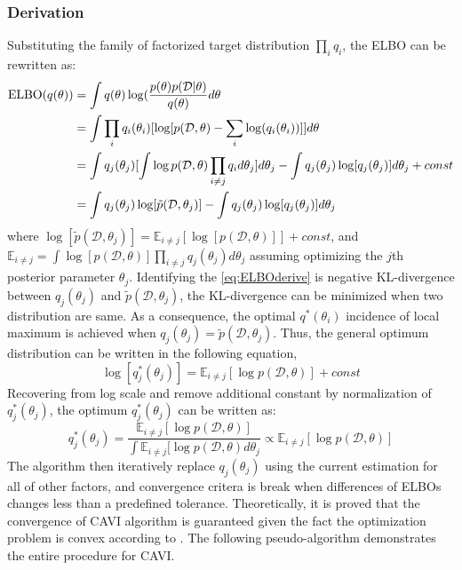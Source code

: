 \subsubsection{Derivation}
Substituting the family of factorized target distribution $\prod_i q_i$, the ELBO can be rewritten as:
\begin{equation}
	\label{eq:ELBOderive}	
	\begin{aligned}
		\textnormal{ELBO}(q(\theta)) &= \int q(\theta)\log(\frac{p(\theta)p(\mathcal{D}|\theta)}{q(\theta)}d\theta \\
		&= \int \prod_i q_i(\theta_i) [\log[p(\mathcal{D},\theta) - \sum_i \log(q_i(\theta_i))]]d\theta \\
		&= \int q_j(\theta_j)[\int \log p(\mathcal{D},\theta) \prod_{i\neq j}q_i d\theta_j]d\theta_j - \int q_j(\theta_j) \log[q_j(\theta_j)]d\theta_j + const\\
		&= \int q_j(\theta_j) \log[\tilde{p}(\mathcal{D},\theta_j)] - \int q_j(\theta_j) \log[q_j(\theta_j)]d\theta_j
	\end{aligned}
\end{equation}
where $\log[\tilde{p}(\mathcal{D},\theta_j)] = \mathbb{E}_{i \neq j}[\log[p(\mathcal{D},\theta)]] + const$, and $\mathbb{E}_{i\neq j} = \int \log[p(\mathcal{D},\theta)]\prod_{i\neq j}q_j(\theta_j)d\theta_j$ assuming optimizing the $j$th posterior parameter $\theta_j$.
Identifying the \ref{eq:ELBOderive} is negative KL-divergence between $q_j(\theta_j) $ and $\tilde{p}(\mathcal{D},\theta_j)$, the KL-divergence can be minimized when two distribution are same.
As a consequence, the optimal $q^{*}(\theta_i)$ incidence of local maximum is achieved when $q_j(\theta_j) = \tilde{p}(\mathcal{D},\theta_j)$. Thus, the general optimum distribution can be written in the following equation,
\begin{equation}
	\label{eq:logoptimumQ}
	\log[q_j^*(\theta_j)] = \mathbb{E}_{i\neq j}[\log p(\mathcal{D},\theta)] + const
\end{equation}
Recovering from log scale and remove additional constant by normalization of $q_j^*(\theta_j)$, the optimum $q_j^*(\theta_j)$ can be written as:
\begin{equation}
	\label{eq:optimalSolution}
	q_j^*(\theta_j) = \frac{\mathbb{E}_{i\neq j}[\log p(\mathcal{D},\theta)]}{\int \mathbb{E}_{i\neq j}[\log p(\mathcal{D},\theta)d\theta_j} \propto \mathbb{E}_{i\neq j}[\log p(\mathcal{D},\theta)]
\end{equation}
The algorithm then iteratively replace $q_j(\theta_j)$ using the current estimation for all of other factors, and convergence critera is break when differences of ELBOs changes less than a predefined tolerance. Theoretically, it is proved that the convergence of CAVI algorithm is guaranteed given the fact the optimization problem is convex according to \cite{boyd2004convex}. The following pseudo-algorithm demonstrates the entire procedure for CAVI.

